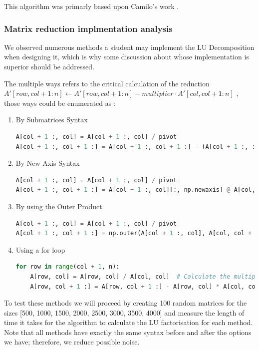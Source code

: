 This algorithm was primarly based upon Camilo's work \cite{bucheli2020}.

\subsubsection{Matrix reduction implmentation analysis}
We observed numerous methods a student may implement the LU Decomposition when designing it, which is why some discussion about whose implementation is superior should be addressed.

The multiple ways refers to the critical calculation of the reduction $ A'[row, col+1:n] \gets A'[row, col+1:n] - multiplier \cdot A'[col, col+1:n] $ , those ways could be enumerated as :

\begin{enumerate}
    \item By Submatrices Syntax
    \begin{lstlisting}[language=Python]
A[col + 1 :, col] = A[col + 1 :, col] / pivot
A[col + 1 :, col + 1 :] = A[col + 1 :, col + 1 :] - (A[col + 1 :, :][:, [col]] @ A[[col], :][:, col + 1 :])
    \end{lstlisting}

    \item By New Axis Syntax
    \begin{lstlisting}[language=Python]
A[col + 1 :, col] = A[col + 1 :, col] / pivot
A[col + 1 :, col + 1 :] = A[col + 1 :, col][:, np.newaxis] @ A[col, col + 1 :][np.newaxis, :]
    \end{lstlisting}

    \item By using the Outer Product
    \begin{lstlisting}[language=Python]
A[col + 1 :, col] = A[col + 1 :, col] / pivot
A[col + 1 :, col + 1 :] = np.outer(A[col + 1 :, col], A[col, col + 1 :])
    \end{lstlisting}

    \item Using a for loop
    \begin{lstlisting}[language=Python]
for row in range(col + 1, n):
    A[row, col] = A[row, col] / A[col, col]  # Calculate the multiplier and store in A for later use
    A[row, col + 1 :] = A[row, col + 1 :] - A[row, col] * A[col, col + 1 :]  # Update the remaining elements in the row using the multiplier
    \end{lstlisting} 
\end{enumerate}

To test these methods we will proceed by creating 100 random matrices for the sizes [500, 1000, 1500, 2000, 2500, 3000, 3500, 4000] and measure the length of time it takes for the algorithm to calculate the LU factorisation for each method. Note that all methods have exactly the same syntax before and after the options we have; therefore, we reduce possible noise.
